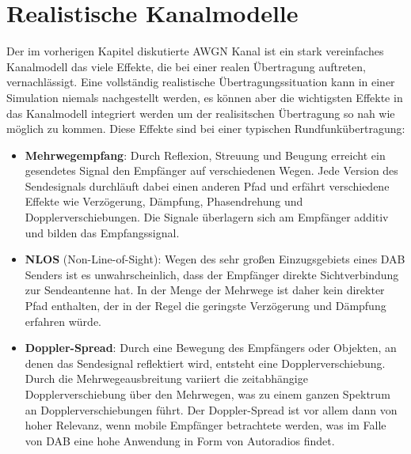 \section{Realistische Kanalmodelle}
Der im vorherigen Kapitel diskutierte AWGN Kanal ist ein stark vereinfaches Kanalmodell das viele Effekte, die bei einer realen Übertragung auftreten, vernachlässigt. Eine vollständig realistische Übertragungssituation kann in einer Simulation niemals nachgestellt werden, es können aber die wichtigsten Effekte in das Kanalmodell integriert werden um der realisitschen Übertragung so nah wie möglich zu kommen. Diese Effekte sind bei einer typischen Rundfunkübertragung:
\begin{itemize}
\item \textbf{Mehrwegempfang}: Durch Reflexion, Streuung und Beugung erreicht ein gesendetes Signal den Empfänger auf verschiedenen Wegen. Jede Version des Sendesignals durchläuft dabei einen anderen Pfad und erfährt verschiedene Effekte wie Verzögerung, Dämpfung, Phasendrehung und Dopplerverschiebungen. Die Signale überlagern sich am Empfänger additiv und bilden das Empfangssignal.
\item \textbf{NLOS} (Non-Line-of-Sight): Wegen des sehr großen Einzugsgebiets eines DAB Senders ist es unwahrscheinlich, dass der Empfänger direkte Sichtverbindung zur Sendeantenne hat. In der Menge der Mehrwege ist daher kein direkter Pfad enthalten, der in der Regel die geringste Verzögerung und Dämpfung erfahren würde.
\item \textbf{Doppler-Spread}: Durch eine Bewegung des Empfängers oder Objekten, an denen das Sendesignal reflektiert wird, entsteht eine Dopplerverschiebung. Durch die Mehrwegeausbreitung variiert die zeitabhängige Dopplerverschiebung über den Mehrwegen, was zu einem ganzen Spektrum an Dopplerverschiebungen führt. Der Doppler-Spread ist vor allem dann von hoher Relevanz, wenn mobile Empfänger betrachtete werden, was im Falle von DAB eine hohe Anwendung in Form von Autoradios findet.
\end{itemize}

